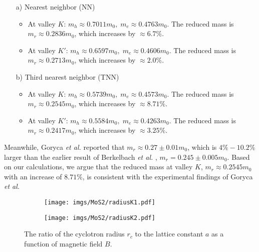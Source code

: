 \documentclass{article}
\begin{document}
\begin{itemize}
	\item[a)] Nearest neighbor (NN)
	      \begin{itemize}
		      \item At valley $K$: $m_{h} \approx 0.7011 m_{0},\; m_{e} \approx 0.4763 m_{0}$.
		            The reduced mass is $m_{r} \approx 0.2836 m_{0}$, which increases by $\approx 6.7\%$.

		      \item At valley $K'$: $m_{h} \approx 0.6597 m_{0},\; m_{e} \approx 0.4606 m_{0}$.
		            The reduced mass is $m_{r} \approx 0.2713 m_{0}$, which increases by $\approx 2.0\%$.
	      \end{itemize}
	\item[b)] Third nearest neighbor (TNN)
	      \begin{itemize}
		      \item At valley $K$: $m_{h} \approx 0.5739 m_{0},\; m_{e} \approx 0.4573 m_{0}$.
		            The reduced mass is $m_{r} \approx 0.2545 m_{0}$, which increases by $\approx 8.71\%$.

		      \item At valley $K'$: $m_{h} \approx 0.5584 m_{0},\; m_{e} \approx 0.4263 m_{0}$.
		            The reduced mass is $m_{r} \approx 0.2417 m_{0}$, which increases by $\approx 3.25\%$.
	      \end{itemize}
\end{itemize}


Meanwhile, Goryca \textit{et al.} \cite{goryca2019} reported that $m_{r} \approx 0.27 \pm 0.01 m_{0}$, which is $4\%-10.2\%$ larger than the earlier result of Berkelbach \textit{et al.} \cite{berkelbach2013}, $m_{r} = 0.245 \pm 0.005 m_{0}$.
Based on our calculations, we argue that the reduced mass at valley $K$, $m_{r} \approx 0.2545 m_{0}$ with an increase of $8.71\%$, is consistent with the experimental findings of Goryca \textit{et al.}

\begin{figure}[!h]
	\begin{subfigure}{0.495\textwidth}
		\centering
		\texttt{[image: imgs/MoS2/radiusK1.pdf]}
	\end{subfigure}
	\begin{subfigure}{0.495\textwidth}
		\centering
		\texttt{[image: imgs/MoS2/radiusK2.pdf]}
	\end{subfigure}
	\caption{The ratio of the cyclotron radius $r_c$ to the lattice constant $a$ as a function of magnetic field $B$.}
\end{figure}
\end{document}
